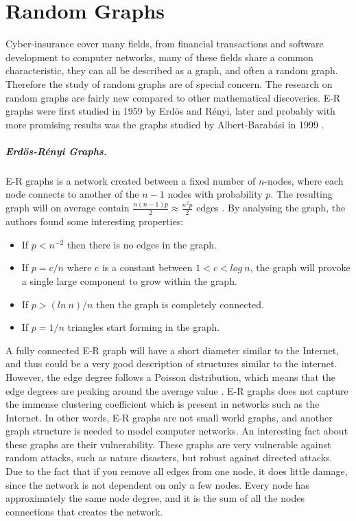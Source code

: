 \section{Random Graphs}
Cyber-insurance cover many fields, from financial transactions and software development to computer networks, many of these fields share a common characteristic, they can all be described as a graph, and often a random graph. Therefore the study of random graphs are of special concern. The research on random graphs are fairly new compared to other mathematical discoveries. E-R graphs were first studied in 1959 by Erdös and Rényi, later and probably with more promising results was the graphs studied by Albert-Barabási in 1999 \cite{audestad}. 
\subparagraph{Erdös-Rényi Graphs.}
E-R graphs is a network created between a fixed number of $n$-nodes, where each node connects to another of the $n-1$ nodes with 
probability $p$. The resulting graph will on average contain $\frac{n(n-1)p}{2} \approx \frac{n^{2}p}{2}$ edges \cite{barabasi}. 
By analysing the graph, the authors found some interesting properties:

\begin{itemize}
\item If $p<n^{-2}$  then there is no edges in the graph. 
\item If $p=c/n$ where c is a constant between $1 < c < log\: n$, the graph will provoke a single large component to grow within the graph.
\item If $p>(ln\: n)/n$ then the graph is completely connected. 
\item If $p = 1/n$ triangles start forming in the graph. 
\end{itemize}

A fully connected E-R graph will have a short diameter similar to the Internet, and thus could be a very good description of structures similar to the internet. However, the edge degree follows a Poisson distribution, which means that the edge degrees are peaking around the average value \cite{audestad}. E-R graphs does not capture the immense clustering coefficient which is present in networks such as the Internet. In other words, E-R graphs are not small world graphs, and another graph structure is needed to model computer networks.
An interesting fact about these graphs are their vulnerability. These graphs are very vulnerable against random attacks, such as nature disasters, but robust against directed attacks. Due to the fact that if you remove all edges from one node, it does little damage, since the network is not dependent on only a few nodes. Every node has approximately the same node degree, and it is the sum of all the nodes connections that creates the network.

